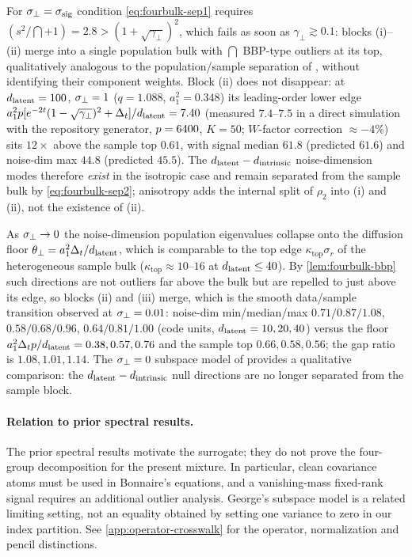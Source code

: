 \begin{remark}\label{rem:fourbulk-isotropic}
For $\sigma_{\perp}=\sigma_{\mathrm{sig}}$ condition \eqref{eq:fourbulk-sep1} requires $(s^2/\dint+1)=2.8>(1+\sqrt{\gamma_\perp})^2$, which fails as soon as $\gamma_\perp\gtrsim0.1$: blocks (i)--(ii) merge into a single population bulk with $\dint$ BBP-type outliers at its top, qualitatively analogous to the population/sample separation of \citet{bonnaire2025}, without identifying their component weights. Block (ii) does not disappear: at $d_{\mathrm{latent}}=100$, $\sigma_{\perp}=1$ ($q=1.088$, $a_1^2=0.348$) its leading-order lower edge $a_1^2p[e^{-2t}(1-\sqrt{\gamma_\perp})^2+\Delta_t]/d_{\mathrm{latent}}=7.40$ (measured $7.4$--$7.5$ in a direct simulation with the repository generator, $p=6400$, $K=50$; $W$-factor correction $\approx-4\%$) sits $12\times$ above the sample top $0.61$, with signal median $61.8$ (predicted $61.6$) and noise-dim max $44.8$ (predicted $45.5$). The $d_{\mathrm{latent}}-d_{\mathrm{intrinsic}}$ noise-dimension modes therefore \emph{exist} in the isotropic case and remain separated from the sample bulk by \eqref{eq:fourbulk-sep2}; anisotropy adds the internal split of $\rho_2$ into (i) and (ii), not the existence of (ii).
\end{remark}

\begin{remark}\label{rem:fourbulk-sigperp0}
As $\sigma_{\perp}\to0$ the noise-dimension population eigenvalues collapse onto the diffusion floor $\theta_\perp=a_1^2\Delta_t/d_{\mathrm{latent}}$, which is comparable to the top edge $\kappa_{\mathrm{top}}\sigma_r$ of the heterogeneous sample bulk ($\kappa_{\mathrm{top}}\approx10$--$16$ at $d_{\mathrm{latent}}\le40$). By \cref{lem:fourbulk-bbp} such directions are not outliers far above the bulk but are repelled to just above its edge, so blocks (ii) and (iii) merge, which is the smooth data/sample transition observed at $\sigma_{\perp}=0.01$: noise-dim min/median/max $0.71/0.87/1.08$, $0.58/0.68/0.96$, $0.64/0.81/1.00$ (code units, $d_{\mathrm{latent}}=10,20,40$) versus the floor $a_1^2\Delta_tp/d_{\mathrm{latent}}=0.38,0.57,0.76$ and the sample top $0.66,0.58,0.56$; the gap ratio is $1.08,1.01,1.14$. The $\sigma_{\perp}=0$ subspace model of \citet{george2025dsm} provides a qualitative comparison: the $d_{\mathrm{latent}}-d_{\mathrm{intrinsic}}$ null directions are no longer separated from the sample block.
\end{remark}

\paragraph{Relation to prior spectral results.}
The prior spectral results motivate the surrogate; they do not prove the four-group decomposition for the present mixture. In particular, clean covariance atoms must be used in Bonnaire's equations, and a vanishing-mass fixed-rank signal requires an additional outlier analysis. George's subspace model is a related limiting setting, not an equality obtained by setting one variance to zero in our index partition. See \cref{app:operator-crosswalk} for the operator, normalization and pencil distinctions.

